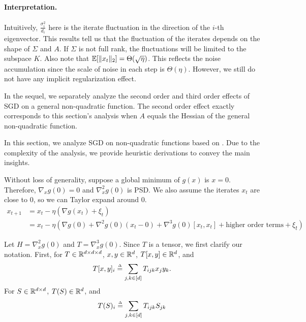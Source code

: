 \paragraph{Interpretation.} Intuitively, $\frac{\sigma_i^2}{d_i}$ here is the iterate fluctuation in the direction of the $i$-th eigenvector. This results tell us that the fluctuation of the iterates depends on the shape of $\Sigma$ and $A$. If $\Sigma$ is not full rank, the fluctuations will be limited to the subspace $K$. Also note that $\operatorname*{\mathbb{E}}[\|x_t\|_2] = \Theta(\sqrt{\eta})$. This reflects the noise accumulation since the scale of noise in each step is $\Theta({\eta})$. However, we still do not have any implicit regularization effect. 


In the sequel, we separately analyze the second order and third order effects of SGD on a general non-quadratic function. The second order effect exactly corresponds to this section's analysis when $A$ equals the Hessian of the general non-quadratic function.

In this section, we analyze SGD on non-quadratic functions based on \cite{damian2021label}. Due to the complexity of the analysis, we provide heuristic derivations to convey the main insights. 

Without loss of generality, suppose a global minimum of $g(x)$ is $x=0$. Therefore, $\nabla_x g(0) = 0$ and $\nabla_x^2 g(0)$ is PSD. We also  assume the iterates $x_t$ are close to $0$, so we can Taylor expand around $0$.
\begin{align}
x_{t+1} &= x_t - \eta(\nabla g(x_t) + \xi_t)\\
&= x_t - \eta(\nabla g(0) + \nabla^2g(0)(x_t - 0) + \nabla^3g(0)[x_t,x_t] + \text{higher order terms} + \xi_t). \label{lec17:eqn:full_gradient_update}
\end{align}

Let $H = \nabla^2_x g(0)$ and $T = \nabla^3_x g(0)$. Since $T$ is a tensor, we first clarify our notation. First, for $T \in \mathbb R^{d\times d\times d}$, $x,y \in \mathbb R^{d}$, $T[x,y]\in \mathbb R^d$, and 
\begin{align}
    T[x,y]_i \defeq \sum_{j,k\in[d]}T_{ijk}x_jy_k.
\end{align} 
For $S\in \mathbb R^{d\times d}$, $T(S)\in \mathbb R^d$, and 
\begin{align} 
    T(S)_i \defeq \sum_{j,k\in[d]}T_{ijk}S_{jk}
\end{align} 

